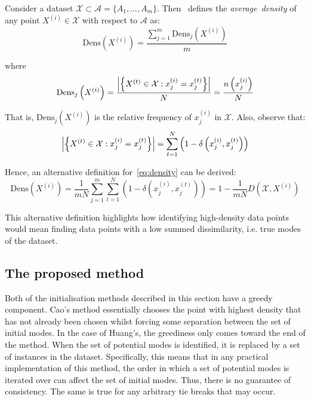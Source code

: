 \begin{definition}\label{def:density}
    Consider a dataset \(\mathcal{X} \subset \mathcal{A} = \{A_1,\ldots,A_m\}\).
    Then~\cite{Cao2009} defines the \emph{average~density} of any point
    \(X^{(i)} \in \mathcal{X}\) with respect to \(\mathcal{A}\) as:
    \begin{equation}\label{eq:density}
        \text{Dens}\left(X^{(i)}\right) 
        = \frac{\sum_{j=1}^m \text{Dens}_{j}\left(X^{(i)}\right)}{m}
    \end{equation}

    \noindent where
    \begin{equation}
        \text{Dens}_{j}\left(X^{(i)}\right) 
        = \frac{%
            \abs*{%
                \left\{X^{(t)} \in \mathcal{X} : x_j^{(i)} = x_j^{(t)}\right\}
            }
        }{N}
        = \frac{n \left(x_j^{(i)}\right)}{N}
    \end{equation}

    That is, \(\text{Dens}_j \left(X^{(i)}\right)\) is the relative
    frequency of \(x_j^{(i)}\) in \(\mathcal X\). Also, observe that:
    \begin{equation}
        \abs*{\left\{X^{(t)} \in \mathcal{X} : x_j^{(i)} = x_j^{(t)}\right\}}%
        = \sum_{t=1}^N \left(1 - \delta\left(x_j^{(i)}, x_j^{(t)}\right)\right)
    \end{equation}

    Hence, an alternative definition for~\eqref{eq:density} can be derived:
    \begin{equation}\label{eq:density-alt}
        \text{Dens}\left(X^{(i)}\right)
        = \frac{1}{mN} \sum_{j=1}^m \sum_{t=1}^N \left(%
            1 - \delta\left(x_j^{(i)}, x_j^{(t)}\right)
        \right)
        = 1 - \frac{1}{mN} D\left(\mathcal{X}, X^{(i)}\right)
    \end{equation}

    This alternative definition highlights how identifying high-density data
    points would mean finding data points with a low summed dissimilarity, i.e.
    true modes of the dataset.
\end{definition}



\subsection{The proposed method}\label{subsec:method}

Both of the initialisation methods described in this section have a greedy
component. Cao's method essentially chooses the point with highest density that
has not already been chosen whilst forcing some separation between the set of
initial modes. In the case of Huang's, the greediness only comes toward the end
of the method. When the set of potential modes is identified, it is replaced by
a set of instances in the dataset. Specifically, this means that in any
practical implementation of this method, the order in which a set of potential
modes is iterated over can affect the set of initial modes. Thus, there is no
guarantee of consistency. The same is true for any arbitrary tie breaks that may
occur.

